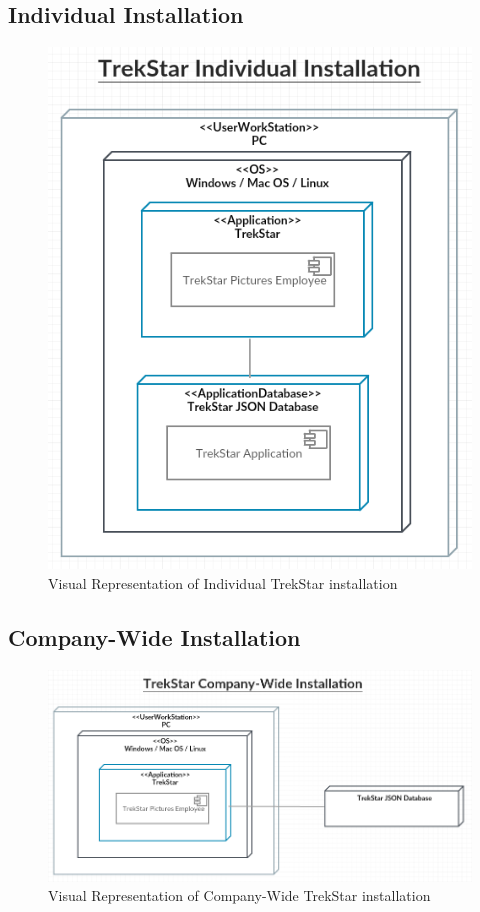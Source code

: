 \documentclass[
  english,
  a4paper,
,tablecaptionabove
]{scrartcl}
\begin{document}
\hypertarget{individual-installation}{%
\subsection{Individual Installation}\label{individual-installation}}

\begin{figure}
\centering
\includegraphics{images/deployment-diagrams/trekstar-individual-installation.png}
\caption{Visual Representation of Individual TrekStar installation}
\end{figure}

\hypertarget{company-wide-installation}{%
\subsection{Company-Wide Installation}\label{company-wide-installation}}

\begin{figure}
\centering
\includegraphics{images/deployment-diagrams/trekstar-company-installation.png}
\caption{Visual Representation of Company-Wide TrekStar installation}
\end{figure}
\end{document}
